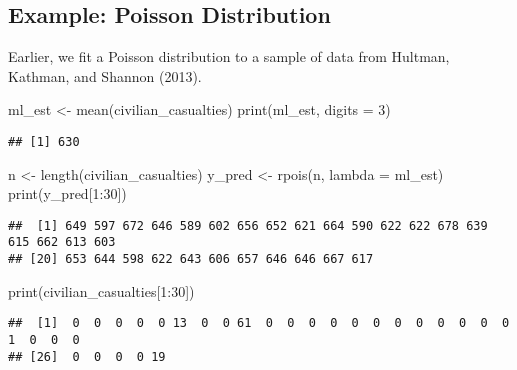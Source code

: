 \documentclass[
]{book}
\newenvironment{Shaded}{\begin{snugshade}}{\end{snugshade}}
\newcommand{\AttributeTok}[1]{\textcolor[rgb]{0.77,0.63,0.00}{#1}}
\newcommand{\DecValTok}[1]{\textcolor[rgb]{0.00,0.00,0.81}{#1}}
\newcommand{\FunctionTok}[1]{\textcolor[rgb]{0.00,0.00,0.00}{#1}}
\newcommand{\NormalTok}[1]{#1}
\newcommand{\OtherTok}[1]{\textcolor[rgb]{0.56,0.35,0.01}{#1}}
\newcommand{\SpecialCharTok}[1]{\textcolor[rgb]{0.00,0.00,0.00}{#1}}
\begin{document}
\hypertarget{example-poisson-distribution-2}{%
\subsection{Example: Poisson
Distribution}\label{example-poisson-distribution-2}}

Earlier, we fit a Poisson distribution to a sample of data from Hultman,
Kathman, and Shannon (2013).

\begin{Shaded}
\begin{Highlighting}[]
\NormalTok{ml\_est }\OtherTok{\textless{}{-}} \FunctionTok{mean}\NormalTok{(civilian\_casualties)}
\FunctionTok{print}\NormalTok{(ml\_est, }\AttributeTok{digits =} \DecValTok{3}\NormalTok{)}
\end{Highlighting}
\end{Shaded}

\begin{verbatim}
## [1] 630
\end{verbatim}

\begin{Shaded}
\begin{Highlighting}[]
\NormalTok{n }\OtherTok{\textless{}{-}} \FunctionTok{length}\NormalTok{(civilian\_casualties)}
\NormalTok{y\_pred }\OtherTok{\textless{}{-}} \FunctionTok{rpois}\NormalTok{(n, }\AttributeTok{lambda =}\NormalTok{ ml\_est)}
\FunctionTok{print}\NormalTok{(y\_pred[}\DecValTok{1}\SpecialCharTok{:}\DecValTok{30}\NormalTok{])}
\end{Highlighting}
\end{Shaded}

\begin{verbatim}
##  [1] 649 597 672 646 589 602 656 652 621 664 590 622 622 678 639 615 662 613 603
## [20] 653 644 598 622 643 606 657 646 646 667 617
\end{verbatim}

\begin{Shaded}
\begin{Highlighting}[]
\FunctionTok{print}\NormalTok{(civilian\_casualties[}\DecValTok{1}\SpecialCharTok{:}\DecValTok{30}\NormalTok{])}
\end{Highlighting}
\end{Shaded}

\begin{verbatim}
##  [1]  0  0  0  0  0 13  0  0 61  0  0  0  0  0  0  0  0  0  0  0  0  1  0  0  0
## [26]  0  0  0  0 19
\end{verbatim}
\end{document}
